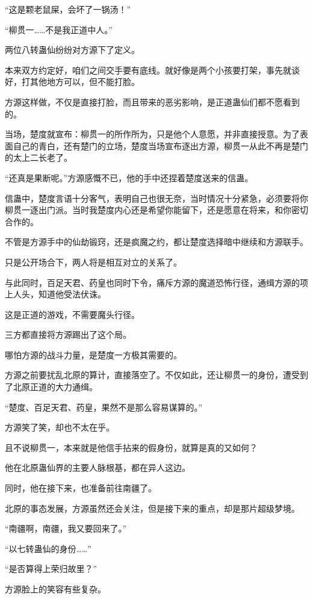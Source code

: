 \begin{this_body}
“这是颗老鼠屎，会坏了一锅汤！”

“柳贯一……不是我正道中人。”

两位八转蛊仙纷纷对方源下了定义。

本来双方约定好，咱们之间交手要有底线。就好像是两个小孩要打架，事先就谈好，打其他地方可以，但不能打脸。

方源这样做，不仅是直接打脸，而且带来的恶劣影响，是正道蛊仙们都不愿看到的。

当场，楚度就宣布：柳贯一的所作所为，只是他个人意愿，并非直接授意。为了表面自己的青白，还有楚门的立场，楚度当场宣布逐出方源，柳贯一从此不再是楚门的太上二长老了。

“还真是果断呢。”方源感慨不已，他的手中还捏着楚度送来的信蛊。

信蛊中，楚度言语十分客气，表明自己也很无奈，当时情况十分紧急，必须要将你柳贯一逐出门派。当时我楚度内心还是希望你能留下，还是愿意在将来，和你密切合作的。

不管是方源手中的仙劫锻窍，还是疯魔之约，都让楚度选择暗中继续和方源联手。

只是公开场合下，两人将是相互对立的关系了。

与此同时，百足天君、药皇也同时下令，痛斥方源的魔道恐怖行径，通缉方源的项上人头，知道他受法伏诛。

这是正道的游戏，不需要魔头行径。

三方都直接将方源踢出了这个局。

哪怕方源的战斗力量，是楚度一方极其需要的。

方源之前要扰乱北原的算计，直接落空了。不仅如此，还让柳贯一的身份，遭受到了北原正道的大力通缉。

“楚度、百足天君、药皇，果然不是那么容易谋算的。”

方源笑了笑，却也不太在乎。

且不说柳贯一，本来就是他信手拈来的假身份，就算是真的又如何？

他在北原蛊仙界的主要人脉根基，都在异人这边。

同时，他在接下来，也准备前往南疆了。

北原的事态发展，方源虽然还会关注，但是接下来的重点，却是那片超级梦境。

“南疆啊，南疆，我又要回来了。”

“以七转蛊仙的身份……”

“是否算得上荣归故里？”

方源脸上的笑容有些复杂。

\end{this_body}


